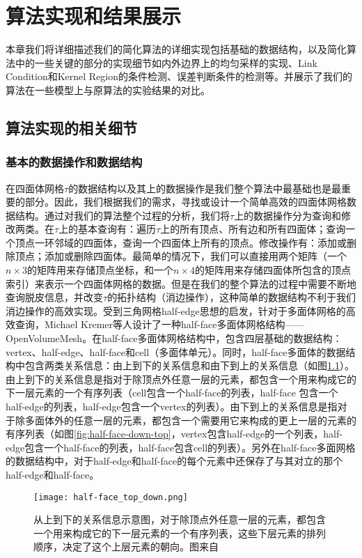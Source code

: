 \chapter{算法实现和结果展示}
本章我们将详细描述我们的简化算法的详细实现包括基础的数据结构，以及简化算法中的一些关键的部分的实现细节如内外边界上的均匀采样的实现、Link Condition和Kernel Region的条件检测、误差判断条件的检测等。并展示了我们的算法在一些模型上与原算法的实验结果的对比。
\section{算法实现的相关细节}
\subsection{基本的数据操作和数据结构}
在四面体网格$\tau$的数据结构以及其上的数据操作是我们整个算法中最基础也是最重要的部分。因此，我们根据我们的需求，寻找或设计一个简单高效的四面体网格数据结构。通过对我们的算法整个过程的分析，我们将$\tau$上的数据操作分为查询和修改两类。在$\tau$上的基本查询有：遍历$\tau$上的所有顶点、所有边和所有四面体；查询一个顶点一环邻域的四面体，查询一个四面体上所有的顶点。修改操作有：添加或删除顶点；添加或删除四面体。最简单的情况下，我们可以直接用两个矩阵（一个$n \times 3$的矩阵用来存储顶点坐标，和一个$n \times 4$的矩阵用来存储四面体所包含的顶点索引）来表示一个四面体网格的数据。但是在我们的整个算法的过程中需要不断地查询脱皮信息，并改变$\tau$的拓扑结构（消边操作），这种简单的数据结构不利于我们消边操作的高效实现。受到三角网格half-edge思想的启发，针对于多面体网格的高效查询，Michael Kremer等人设计了一种half-face多面体网格结构——OpenVolumeMesh\cite{open-volume-mesh}。在half-face多面体网格结构中，包含四层基础的数据结构：vertex、half-edge、half-face和cell（多面体单元）。同时，half-face多面体的数据结构中包含两类关系信息：由上到下的关系信息和由下到上的关系信息（如图\ref{fig:half-face-top-down}）。由上到下的关系信息是指对于除顶点外任意一层的元素，都包含一个用来构成它的下一层元素的一个有序列表（cell包含一个half-face的列表，half-face 包含一个half-edge的列表，half-edge包含一个vertex的列表）。由下到上的关系信息是指对于除多面体外的任意一层的元素，都包含一个需要用它来构成的更上一层的元素的有序列表（如图\ref{fig:half-face-down-top}，vertex包含half-edge的一个列表，half-edge包含一个half-face的列表，half-face包含cell的列表）。另外在half-face多面网格的数据结构中，对于half-edge和half-face的每个元素中还保存了与其对立的那个half-edge和half-face。\par
\begin{figure}[htbp]
    \centering
    \texttt{[image: half-face\_top\_down.png]}
    \caption[half-face从上到下的关系]{从上到下的关系信息示意图，对于除顶点外任意一层的元素，都包含一个用来构成它的下一层元素的一个有序列表，这些下层元素的排列顺序，决定了这个上层元素的朝向。图来自\cite{open-volume-mesh}}
    \label{fig:half-face-top-down}
\end{figure}

